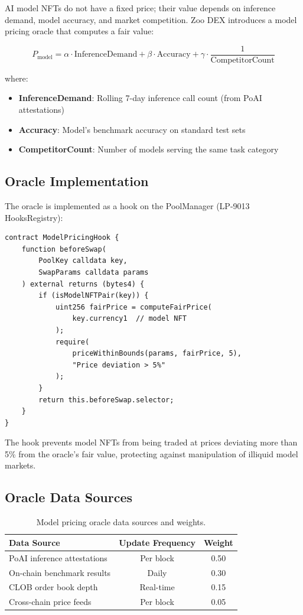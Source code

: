 \documentclass[11pt,letterpaper]{article}
\begin{document}
AI model NFTs do not have a fixed price; their value depends on inference demand, model accuracy, and market competition. Zoo DEX introduces a model pricing oracle that computes a fair value:

\begin{equation}
P_{\text{model}} = \alpha \cdot \text{InferenceDemand} + \beta \cdot \text{Accuracy} + \gamma \cdot \frac{1}{\text{CompetitorCount}}
\end{equation}

where:
\begin{itemize}
    \item \textbf{InferenceDemand}: Rolling 7-day inference call count (from PoAI attestations)
    \item \textbf{Accuracy}: Model's benchmark accuracy on standard test sets
    \item \textbf{CompetitorCount}: Number of models serving the same task category
\end{itemize}

\subsection{Oracle Implementation}

The oracle is implemented as a hook on the PoolManager (LP-9013 HooksRegistry):

\begin{lstlisting}[basicstyle=\ttfamily\small,caption=Model Pricing Oracle Hook]
contract ModelPricingHook {
    function beforeSwap(
        PoolKey calldata key,
        SwapParams calldata params
    ) external returns (bytes4) {
        if (isModelNFTPair(key)) {
            uint256 fairPrice = computeFairPrice(
                key.currency1  // model NFT
            );
            require(
                priceWithinBounds(params, fairPrice, 5),
                "Price deviation > 5%"
            );
        }
        return this.beforeSwap.selector;
    }
}
\end{lstlisting}

The hook prevents model NFTs from being traded at prices deviating more than 5\% from the oracle's fair value, protecting against manipulation of illiquid model markets.

\subsection{Oracle Data Sources}

\begin{table}[t]
\centering
\begin{tabular}{lcc}
\toprule
\textbf{Data Source} & \textbf{Update Frequency} & \textbf{Weight} \\
\midrule
PoAI inference attestations & Per block & 0.50 \\
On-chain benchmark results & Daily & 0.30 \\
CLOB order book depth & Real-time & 0.15 \\
Cross-chain price feeds & Per block & 0.05 \\
\bottomrule
\end{tabular}
\caption{Model pricing oracle data sources and weights.}
\label{tab:oracle}
\end{table}
\end{document}
